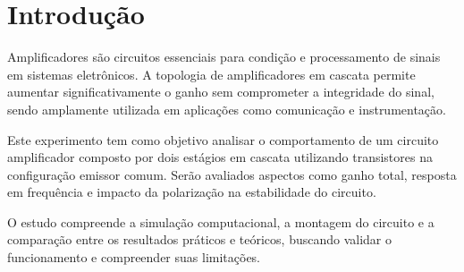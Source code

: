 \section{Introdução}

Amplificadores são circuitos essenciais para condição e processamento de sinais em sistemas eletrônicos. A topologia de amplificadores em cascata permite aumentar significativamente o ganho sem comprometer a integridade do sinal, sendo amplamente utilizada em aplicações como comunicação e instrumentação.

Este experimento tem como objetivo analisar o comportamento de um circuito amplificador composto por dois estágios em cascata utilizando transistores na configuração emissor comum. Serão avaliados aspectos como ganho total, resposta em frequência e impacto da polarização na estabilidade do circuito.

O estudo compreende a simulação computacional, a montagem do circuito e a comparação entre os resultados práticos e teóricos, buscando validar o funcionamento e compreender suas limitações.